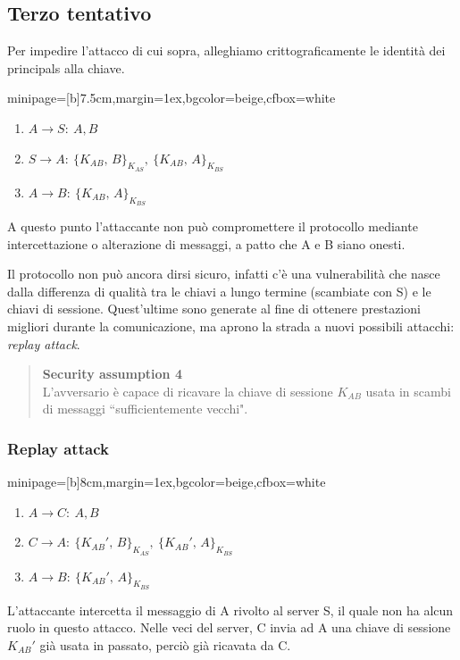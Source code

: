 \documentclass[a4paper, 11pt, twoside, openright, fleqn]{report}
\newcommand{\fromto}[2]{#1\rightarrow #2\!:\ }
\newenvironment{colbox}[2]%
{%
	\par\noindent\hspace{10pt}
	\begin{adjustbox}{minipage=[b]{#2},margin=1ex,bgcolor=#1,cfbox=white}
}{%
	\end{adjustbox}\newline%
}
\begin{document}
\subsection{Terzo tentativo}
Per impedire l'attacco di cui sopra, alleghiamo crittograficamente le identità dei principals alla chiave.
\begin{colbox}{beige}{7.5cm}
	\begin{enumerate}
		\item $\fromto{A}{S}A, B$
		\item $\fromto{S}{A}\{K_{AB},\,B\}_{K_{AS}},\ \{K_{AB},\,A\}_{K_{BS}}$
		\item $\fromto{A}{B}\{K_{AB},\,A\}_{K_{BS}}$
	\end{enumerate}
\end{colbox}
A questo punto l'attaccante non può compromettere il protocollo mediante intercettazione o alterazione di messaggi, a patto che A e B siano onesti.

Il protocollo non può ancora dirsi sicuro, infatti c'è una vulnerabilità che nasce dalla differenza di qualità tra le chiavi a lungo termine (scambiate con S) e le chiavi di sessione. Quest'ultime sono generate al fine di ottenere prestazioni migliori durante la comunicazione, ma aprono la strada a nuovi possibili attacchi: \emph{replay attack}.
\begin{quote}
	\textbf{Security assumption 4}\\
	L'avversario è capace di ricavare la chiave di sessione $K_{AB}$ usata in scambi di messaggi ``sufficientemente vecchi".
\end{quote}

\subsubsection{Replay attack}
\begin{colbox}{beige}{8cm}
	\begin{enumerate}
		\item $\fromto{A}{C}A, B$
		\item $\fromto{C}{A}\{K_{AB}',\,B\}_{K_{AS}},\ \{K_{AB}',\,A\}_{K_{BS}}$
		\item $\fromto{A}{B}\{K_{AB}',\,A\}_{K_{BS}}$
	\end{enumerate}
\end{colbox}
L'attaccante intercetta il messaggio di A rivolto al server S, il quale non ha alcun ruolo in questo attacco. Nelle veci del server, C invia ad A una chiave di sessione $K_{AB}'$ già usata in passato, perciò già ricavata da C.
\end{document}
